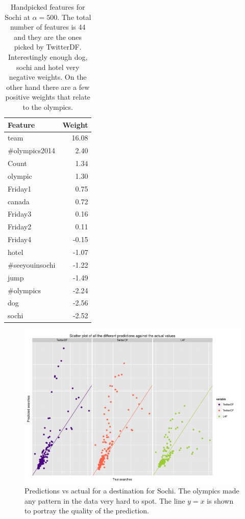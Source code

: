 \documentclass[minf,twoside,singlespacing,parskip,frontabs,notimes,11pt]{infthesis}
\begin{document}
\begin{table}[]
\begin{center}
\begin{tabular}{l | r}
Feature & Weight\\
\hline
team & 16.08\\
\#olympics2014 & 2.40\\
Count & 1.34\\
olympic & 1.30\\
Friday1 & 0.75\\
canada & 0.72\\
Friday3 & 0.16\\
Friday2 & 0.11\\
Friday4 & -0.15\\
hotel & -1.07\\
\#seeyouinsochi & -1.22\\
jump & -1.49\\
\#olympics & -2.24\\
dog & -2.56\\
sochi & -2.52\\
\end{tabular}
\end{center}
\caption{Handpicked features for Sochi at $\alpha=500$. The total number of features is 44 and they are the ones picked by TwitterDF. Interestingly enough dog, sochi and hotel very negative weights. On the other hand there are a few positive weights that relate to the olympics.} 
\label{tab:sochi-table}
\end{table}



\begin{figure}[]
\begin{center}
\includegraphics[scale=0.5]{plots/Sochi}
\end{center}
\caption{Predictions vs actual for a destination for Sochi. The olympics made any pattern in the data very hard to spot. The line $y = x$ is shown to portray the quality of the prediction.}
\end{figure}
\end{document}
